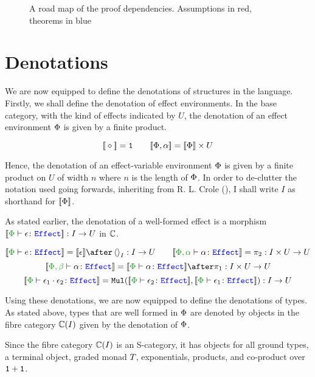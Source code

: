 \documentclass{Report}
\begin{document}
\begin{figure}[ht!]
\begin{center}
{
    }
    \end{center}
\caption{A road map of the proof dependencies. Assumptions in red, theorems in blue}
\label{RoadMap}
\end{figure}


\section{Denotations}\label{PECDenotations}
We are now equipped to define the denotations of structures in the language. Firstly, we shall define the denotation of effect environments. In the base category, with the kind of effects indicated by $U$, the denotation of an effect environment $\P$ is given by a finite product.

\[
\deno{\nil} = \1 \quad\quad \deno{\P, \a} = \deno{\P}\times U    
\]

Hence, the denotation of an  effect-variable environment $\P$ is given by a finite product on $U$ of width $n$ where $n$ is the length of $\P$. In order to de-clutter the notation used going forwards, inheriting from R. L. Crole (\cite{crole_1994}), I shall write $I$ as shorthand for $\deno{\P}$.  


As stated earlier, the denotation of a well-formed effect is a morphism $\deno{\typerelation{\P}{\e}{\effect}}: I \rightarrow U$ in $\C$.

\[
    \deno{\typerelation{\P}{e}{\effect}} = \deno{\e} \after \term{I}: I\rightarrow U
    \quad\quad
    \deno{\typerelation{\P,\a}{\a}{\effect}} = \pp: I\times U \rightarrow U
\]\[
    \deno{\typerelation{\P, \b}{\a}{\effect}} = \deno{\typerelation{\P}{\a}{\effect}}\after\p: I\times U\rightarrow U
\]\[
    \deno{\typerelation{\P}{\e_1\dot \e_2}{\effect}} = \Mul(\deno{\typerelation{\P}{\e_2}{\effect}},\deno{\typerelation{\P}{\e_1}{\effect}}): I \rightarrow U
\]

Using these denotations, we are now equipped to define the denotations of types. As stated above, types that are well formed in $\P$ are denoted by objects in the fibre category $\C(I)$ given by the denotation of $\P$.
 
Since the fibre category $\C(I)$ is an S-category, it has objects for all ground types, a terminal object, graded monad $\T{}{}$, exponentials, products, and co-product over $\1+\1$.
\end{document}
